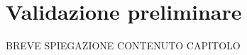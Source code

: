 \chapter{Validazione preliminare} %
%


\begin{citazione}
	BREVE SPIEGAZIONE CONTENUTO CAPITOLO
\end{citazione}

\newpage
